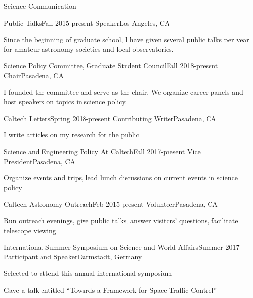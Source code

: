 \documentclass{resume} %
\begin{document}

\begin{rSection}{Science Communication}

  \begin{rSubsection}{Public Talks}{Fall 2015-present}
    {Speaker}{Los Angeles, CA}
  \item Since the beginning of graduate school, I have given several public talks
    per year for amateur astronomy societies and local observatories.
  \end{rSubsection}

  \begin{rSubsection}{Science Policy Committee, Graduate Student Council}{Fall 2018-present}
    {Chair}{Pasadena, CA}
  \item I founded the committee and serve as the chair. 
    We organize career panels and host speakers on topics in science policy.
  \end{rSubsection}

  \begin{rSubsection}{Caltech Letters}{Spring 2018-present}
    {Contributing Writer}{Pasadena, CA}
  \item I write articles on my research for the public
  \end{rSubsection}

  \begin{rSubsection}{Science and Engineering Policy At Caltech}{Fall 2017-present}
    {Vice President}{Pasadena, CA}
  \item Organize events and trips,
    lead lunch discussions on current events in science policy
  \end{rSubsection}

  \begin{rSubsection}{Caltech Astronomy Outreach}{Feb 2015-present}
    {Volunteer}{Pasadena, CA}
  \item Run outreach evenings, give public talks, answer visitors' questions, 
    facilitate telescope viewing
  \end{rSubsection}

  \begin{rSubsection}{International Summer Symposium on Science and World Affairs}{Summer 2017}
      {Participant and Speaker}{Darmstadt, Germany}
    \item Selected to attend this annual international symposium
    \item Gave a talk entitled ``Towards a Framework for Space Traffic Control''
  \end{rSubsection}


\end{rSection}
\end{document}
